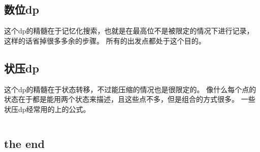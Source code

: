 \documentclass[a4paper,11pt]{article}
\begin{document}
\begin{CJK}{UTF8}{gbsn}
\subsection{数位dp}
这个dp的精髓在于记忆化搜索，也就是在最高位不是被限定的情况下进行记录，这样的话省掉很多多余的步骤。
所有的出发点都处于这个目的。
\subsection{状压dp}
这个dp的精髓在于状态转移，不过能压缩的情况也是很限定的。
像什么每个点的状态在于都是能用两个状态来描述，且这些点不多，但是组合的方式很多。
一些状压dp经常用的上的公式。
\inputminted{c++}{../scoure/dp/zhuangtai.cpp}
\subsection{the end}
\end{CJK}
\end{document}
